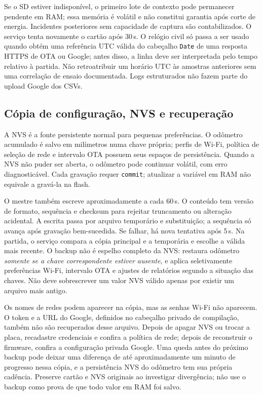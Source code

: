 Se o SD estiver indisponível, o primeiro lote de contexto pode permanecer pendente em RAM; essa memória é volátil e não constitui garantia após corte de energia. Incidentes posteriores sem capacidade de captura são contabilizados. O serviço tenta novamente o cartão após 30\,s. O relógio civil só passa a ser usado quando obtém uma referência UTC válida do cabeçalho \texttt{Date} de uma resposta HTTPS de OTA ou Google; antes disso, a linha deve ser interpretada pelo tempo relativo à partida. Não retroatribuir um horário UTC às amostras anteriores sem uma correlação de ensaio documentada. Logs estruturados não fazem parte do upload Google dos CSVs.

\subsection{Cópia de configuração, NVS e recuperação}\label{sec:backup_config}
A NVS é a fonte persistente normal para pequenas preferências. O odômetro acumulado é salvo em milímetros numa chave própria; perfis de Wi-Fi, política de seleção de rede e intervalo OTA possuem seus espaços de persistência. Quando a NVS não puder ser aberta, o odômetro pode continuar volátil, com erro diagnosticável. Cada gravação requer \texttt{commit}; atualizar a variável em RAM não equivale a gravá-la na flash.

O mestre também escreve  aproximadamente a cada 60\,s. O conteúdo tem versão de formato, sequência e checksum para rejeitar truncamento ou alteração acidental. A escrita passa por arquivo temporário e substituição; a sequência só avança após gravação bem-sucedida. Se falhar, há nova tentativa após 5\,s. Na partida, o serviço compara a cópia principal e a temporária e escolhe a válida mais recente. O backup não é espelho completo da NVS: restaura odômetro \emph{somente se a chave correspondente estiver ausente}, e aplica seletivamente preferências Wi-Fi, intervalo OTA e ajustes de relatórios segundo a situação das chaves. Não deve sobrescrever um valor NVS válido apenas por existir um arquivo mais antigo.

Os nomes de redes podem aparecer na cópia, mas as senhas Wi-Fi não aparecem. O token e a URL do Google, definidos no cabeçalho privado de compilação, também não são recuperados desse arquivo. Depois de apagar NVS ou trocar a placa, recadastre credenciais e confira a política de rede; depois de reconstruir o firmware, confira a configuração privada Google. Uma queda antes do próximo backup pode deixar uma diferença de até aproximadamente um minuto de progresso nessa cópia, e a persistência NVS do odômetro tem sua própria cadência. Preserve cartão e NVS originais ao investigar divergência; não use o backup como prova de que todo valor em RAM foi salvo.


